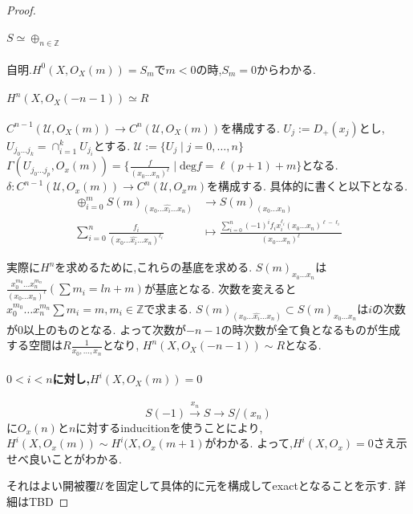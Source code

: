 \begin{proof}
\paragraph{$S \simeq \oplus_{n \in \mathbb{Z}}$}
自明.$H^0(X, O_X(m)) = S_m$で$m < 0$の時,$S_m =0$からわかる.
\paragraph{$H^n(X, O_X(-n-1)) \simeq R$}
$C^{n-1}(\mathcal{U}, O_X(m)) \to C^n(\mathcal{U}, O_X(m))$を構成する.
$U_j:= D_+(x_j)$とし,$U_{j_0\ldots j_k} = \cap_{i=1}^k U_{j_i}$とする.
$\mathcal{U}:= \{U_j \mid j=0, \ldots, n\}$
$\Gamma(U_{j_0 \ldots j_p}, O_x(m)) = \{\frac{f}{(x_0\ldots x_n)^{\ell}} \mid \mathrm{deg}f = \ell(p+1) +m\}$となる.
$ \delta: C^{n-1}(\mathcal{U}, O_x(m)) \to C^n(\mathcal{U}, O_xm)$を構成する.
具体的に書くと以下となる.
\begin{align*}
  \oplus_{i=0}^m S(m)_{(x_0 \ldots \hat{x_i} \ldots x_n)} & \to S(m)_{(x_0\ldots x_n)} \\
  \sum_{i=0}^n \frac{f_i}{(x_0 \ldots \hat{x_i} \ldots x_n)^{\ell_i}} &\mapsto \frac{\sum_{i=0}^n (-1)^i f_i x_i^{\ell_i}(x_0 \ldots x_n)^{\ell - \ell_i}}{(x_0 \ldots x_n)^{\ell}}
\end{align*}

実際に$H^n$を求めるために,これらの基底を求める.
$S(m)_{x_0 \ldots x_n}$は$\frac{x_0^{m_0}\ldots x_n^{m_n}}{(x_0 \ldots x_n)^{\ell}}(\sum m_i = ln + m)$が基底となる.
次数を変えると$x_0^{m_0}\ldots x_n^{m_n} \sum m_i =m, m_i \in \mathbb{Z}$で求まる.
$S(m)_{(x_0 \ldots \hat{x_i} \ldots x_n)} \subset S(m)_{x_0 \ldots x_n}$は$i$の次数が$0$以上のものとなる.
よって次数が$-n-1$の時次数が全て負となるものが生成する空間は$R \frac{1}{x_0,\dots,x_n}$となり,
$H^n(X, O_X(-n-1)) \sim R$となる.

\paragraph{$0 < i < n$に対し,$H^i(X, O_X(m)) = 0$}
\begin{equation*}
    S(-1) \xrightarrow{x_n} S \to S/(x_n)
\end{equation*}
に$O_x(n)$と$n$に対するinducitionを使うことにより,
$H^i(X, O_x(m)) \sim H^i(X, O_x(m+1)$がわかる.
よって,$H^i(X, O_x)=0$さえ示せべ良いことがわかる.

それはよい開被覆$\mathcal{U}$を固定して具体的に元を構成してexactとなることを示す.
詳細はTBD

\end{proof}

